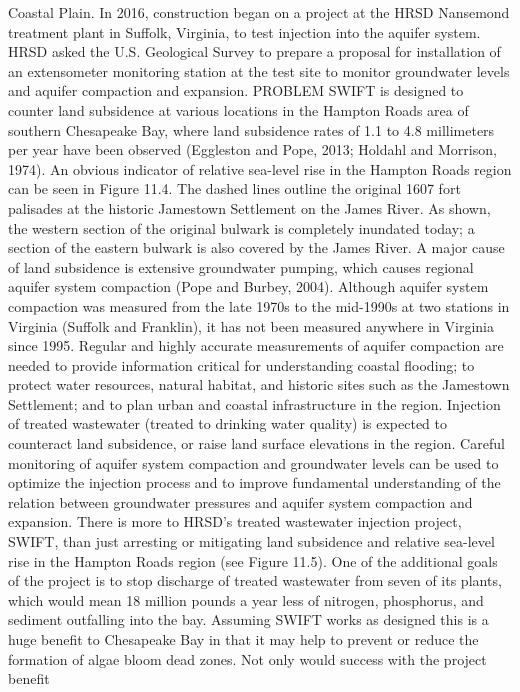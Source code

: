 \documentclass{article}
\begin{document}
Coastal Plain. In 2016, construction began on a project at the HRSD
Nansemond treatment plant in Suffolk, Virginia, to test injection into
the aquifer system. HRSD asked the U.S. Geological Survey to prepare a
proposal for installation of an extensometer monitoring station at the
test site to monitor groundwater levels and aquifer compaction and
expansion. PROBLEM SWIFT is designed to counter land subsidence at
various locations in the Hampton Roads area of southern Chesapeake Bay,
where land subsidence rates of 1.1 to 4.8 millimeters per year have been
observed (Eggleston and Pope, 2013; Holdahl and Morrison, 1974). An
obvious indicator of relative sea-level rise in the Hampton Roads region
can be seen in Figure 11.4. The dashed lines outline the original 1607
fort palisades at the historic Jamestown Settlement on the James River.
As shown, the western section of the original bulwark is completely
inundated today; a section of the eastern bulwark is also covered by the
James River. A major cause of land subsidence is extensive groundwater
pumping, which causes regional aquifer system compaction (Pope and
Burbey, 2004). Although aquifer system compaction was measured from the
late 1970s to the mid-1990s at two stations in Virginia (Suffolk and
Franklin), it has not been measured anywhere in Virginia since 1995.
Regular and highly accurate measurements of aquifer compaction are
needed to provide information critical for understanding coastal
flooding; to protect water resources, natural habitat, and historic
sites such as the Jamestown Settlement; and to plan urban and coastal
infrastructure in the region. Injection of treated wastewater (treated
to drinking water quality) is expected to counteract land subsidence, or
raise land surface elevations in the region. Careful monitoring of
aquifer system compaction and groundwater levels can be used to optimize
the injection process and to improve fundamental understanding of the
relation between groundwater pressures and aquifer system compaction and
expansion. There is more to HRSD's treated wastewater injection project,
SWIFT, than just arresting or mitigating land subsidence and relative
sea-level rise in the Hampton Roads region (see Figure 11.5). One of the
additional goals of the project is to stop discharge of treated
wastewater from seven of its plants, which would mean 18 million pounds
a year less of nitrogen, phosphorus, and sediment outfalling into the
bay. Assuming SWIFT works as designed this is a huge benefit to
Chesapeake Bay in that it may help to prevent or reduce the formation of
algae bloom dead zones. Not only would success with the project benefit
\end{document}
